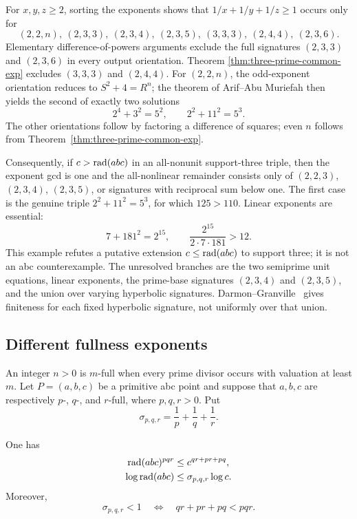 For $x,y,z\geq2$, sorting the exponents shows that
$1/x+1/y+1/z\geq1$ occurs only for
\[
 (2,2,n),\ (2,3,3),\ (2,3,4),\ (2,3,5),\
 (3,3,3),\ (2,4,4),\ (2,3,6).
\]
Elementary difference-of-powers arguments exclude the full signatures
$(2,3,3)$ and $(2,3,6)$ in every output orientation.  Theorem
\ref{thm:three-prime-common-exp} excludes $(3,3,3)$ and $(2,4,4)$.
For $(2,2,n)$, the odd-exponent orientation reduces to
$S^2+4=R^n$; the theorem of Arif--Abu Muriefah
\cite{ArifAbuMuriefah2001} then yields the second of exactly two solutions
\[
                 2^4+3^2=5^2,\qquad 2^2+11^2=5^3.
\]
The other orientations follow by factoring a difference of squares; even
$n$ follows from Theorem~\ref{thm:three-prime-common-exp}.

Consequently, if $c>\operatorname{rad}(abc)$ in an all-nonunit support-three triple, then
the exponent gcd is one and the all-nonlinear remainder consists only of
$(2,2,3)$, $(2,3,4)$, $(2,3,5)$, or signatures with reciprocal sum below
one.  The first case is the genuine triple
$2^2+11^2=5^3$, for which $125>110$.  Linear exponents are essential:
\[
                 7+181^2=2^{15},\qquad
 \frac{2^{15}}{2\cdot7\cdot181}>12.
\]
This example refutes a putative extension $c\leq\operatorname{rad}(abc)$ to support
three; it is not an abc counterexample.  The unresolved branches are the two
semiprime unit equations, linear exponents, the prime-base signatures
$(2,3,4)$ and $(2,3,5)$, and the union over varying hyperbolic signatures.
Darmon--Granville~\cite{DarmonGranville1995} gives finiteness for each fixed
hyperbolic signature, not uniformly over that union.

\subsection{Different fullness exponents}

An integer $n>0$ is $m$-full when every prime divisor occurs with valuation
at least $m$.  Let $P=(a,b,c)$ be a primitive abc point and suppose that
$a,b,c$ are respectively $p$-, $q$-, and $r$-full, where $p,q,r>0$.  Put
\[
       \sigma_{p,q,r}=\frac1p+\frac1q+\frac1r.
\]

\begin{theorem}
\label{thm:mixed-full-compression}
One has
\begin{align}
 \operatorname{rad}(abc)^{pqr}&\le c^{qr+pr+pq},\label{eq:mixed-full-natural}\\
 \log\operatorname{rad}(abc)&\le \sigma_{p,q,r}\log c.\label{eq:mixed-full-log}
\end{align}
Moreover,
\[
 \sigma_{p,q,r}<1\quad\Longleftrightarrow\quad
 qr+pr+pq<pqr.
\]
\end{theorem}

